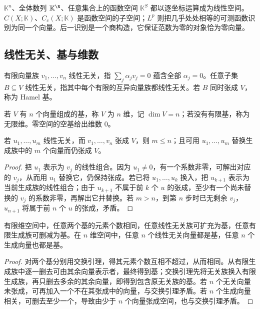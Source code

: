 \begin{example}[后续使用的线性空间]
$\mathbb K^n$、全体数列 $\mathbb K^{\N}$、任意集合上的函数空间 $\mathbb K^S$ 都以逐坐标运算成为线性空间。$C(X;\mathbb K)$、$C_c(X;\mathbb K)$ 是函数空间的子空间；$L^p$ 则把几乎处处相等的可测函数识别为同一个向量。后一识别是一个商构造，它保证范数为零的对象恰为零向量。
\end{example}

\subsection{线性无关、基与维数}
\begin{definition}\label{def:y0-linear-independence}
有限向量族 $v_1,\ldots,v_n$ 线性无关，指 $\sum_j\alpha_jv_j=0$ 蕴含全部 $\alpha_j=0$。任意子集 $B\subseteq V$ 线性无关，指其中每个有限的互异向量族都线性无关。若 $B$ 同时张成 $V$，称为 Hamel 基。

若 $V$ 有 $n$ 个向量组成的基，称 $V$ 为 $n$ 维，记 $\dim V=n$；若没有有限基，称为无限维。零空间的空基给出维数 $0$。
\end{definition}

\begin{lemma}[有限交换引理]\label{lem:y0-exchange}
若 $u_1,\ldots,u_m$ 线性无关，而 $v_1,\ldots,v_n$ 张成 $V$，则 $m\le n$；且可用 $u_1,\ldots,u_m$ 替换生成族中的 $m$ 个向量而仍张成 $V$。
\end{lemma}
\begin{proof}
把 $u_1$ 表示为 $v_j$ 的线性组合。因为 $u_1\ne0$，有一个系数非零，可解出对应的 $v_j$，从而用 $u_1$ 替换它，仍保持张成。若已将 $u_1,\ldots,u_k$ 换入，把 $u_{k+1}$ 表示为当前生成族的线性组合；由于 $u_{k+1}$ 不属于前 $k$ 个 $u$ 的张成，至少有一个尚未替换的 $v_j$ 的系数非零，再解出它并替换。若 $m>n$，到第 $n$ 步时已无剩余 $v_j$，$u_{n+1}$ 将属于前 $n$ 个 $u$ 的张成，矛盾。
\end{proof}

\begin{corollary}[有限维空间的基定理]\label{cor:y0-finite-basis}
有限维空间中，任意两个基的元素个数相同，任意线性无关族可扩充为基，任意有限生成族可删减为基。在 $n$ 维空间中，任意 $n$ 个线性无关向量都是基，任意 $n$ 个生成向量也都是基。
\end{corollary}
\begin{proof}
对两个基分别用交换引理，得其元素个数互相不超过，从而相同。从有限生成族中逐一删去可由其余向量表示者，最终得到基；交换引理先将无关族换入有限生成族，再只删去多余的其余向量，即得到包含原无关族的基。若 $n$ 个无关向量未张成，可再加入一个不在其张成中的向量，与交换引理矛盾。若 $n$ 个生成向量相关，可删去至少一个，导致由少于 $n$ 个向量张成空间，也与交换引理矛盾。
\end{proof}

